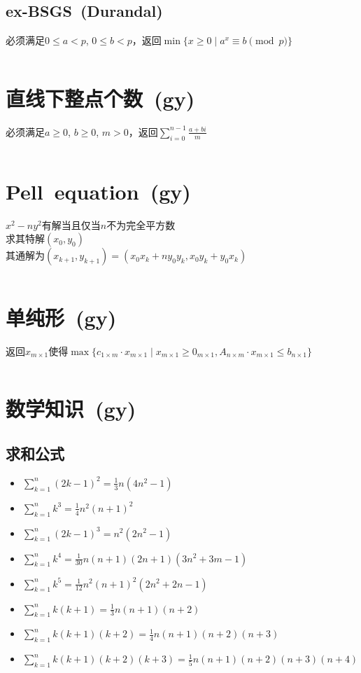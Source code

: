 	\subsection{ex-BSGS\ \small(Durandal)}
		必须满足$ 0 \leq a < p $, $ 0 \leq b < p $，返回$ \min\lbrace x \geq 0 \mid a^x \equiv b \pmod p\rbrace $
		\inputminted{cpp}{Math/ex_bsgs.cpp}
\section{直线下整点个数\ \small(gy)}
	必须满足$ a \geq 0 $, $ b \geq 0 $, $ m > 0 $，返回$ \sum\limits_{i=0}^{n-1} \frac{a + bi}{m} $
	\inputminted{cpp}{Math/points_below_line.cpp}
\section{Pell\ equation\ \small(gy)}
	$ x^2 - n y^2 $有解当且仅当$ n $不为完全平方数
	\\求其特解$ (x_0, y_0) $
	\\其通解为$ (x_{k + 1}, y_{k + 1}) = (x_0 x_k + n y_0 y_k, x_0 y_k + y_0 x_k ) $
	\inputminted{cpp}{Math/pell.cpp}
\section{单纯形\ \small(gy)}
	返回$ x_{m \times 1} $使得$ \max \lbrace c_{1 \times m} \cdot x_{m \times 1} \mid x_{m \times 1} \geq 0_{m \times 1}, A_{n \times m} \cdot x_{m \times 1} \leq b_{n \times 1} \rbrace $
	\inputminted{cpp}{Math/simplex.cpp}
\section{数学知识\ \small(gy)}
\newcommand{\eularian}{\genfrac\langle\rangle{0pt}{0}}
\newcommand{\Eularian}[2]{\left\langle\!\!\!\eularian{#1}{#2}\!\!\!\right\rangle}
	\subsection*{求和公式}
		\begin{itemize}
			\item $ \sum\limits_{k=1}^{n} (2k - 1)^2 = \frac{1}{3} n(4n^2 - 1) $
			\item $ \sum\limits_{k=1}^{n} k^3 = \frac{1}{4} n^2(n + 1)^2 $
			\item $ \sum\limits_{k=1}^{n} (2k - 1)^3 = n^2(2n^2 - 1) $
			\item $ \sum\limits_{k=1}^{n} k^4 = \frac{1}{30} n(n + 1) (2n + 1) (3n^2 + 3m - 1) $
			\item $ \sum\limits_{k=1}^{n} k^5 = \frac{1}{12} n^2(n + 1)^2(2n^2 + 2n - 1) $
			\item $ \sum\limits_{k=1}^{n} k(k + 1) = \frac{1}{3} n(n + 1)(n + 2) $
			\item $ \sum\limits_{k=1}^{n} k(k + 1)(k + 2) = \frac{1}{4} n(n + 1)(n + 2)(n + 3) $
			\item $ \sum\limits_{k=1}^{n} k(k + 1)(k + 2)(k + 3) = \frac{1}{5} n(n + 1)(n + 2)(n + 3)(n + 4) $
		\end{itemize}
